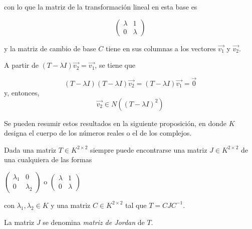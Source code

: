 \noindent
con lo que la matriz de la transformación lineal en esta base es 

$$\left(\begin{array}{cc}  \lambda & 1  \\ 0 &  \lambda
\end{array}
\right)$$
\bigskip

\noindent
y la matriz de cambio de base $C$ tiene en sus columnas a los vectores $\vec{v_1}$ y  $\vec{v_2}$. 

\bigskip





\bigskip

\begin{remark}
A partir de $(T-\lambda I ) \vec{v_2}= \vec{v_1}$, se tiene que 


$$(T-\lambda I )(T-\lambda I ) \vec{v_2}= (T-\lambda I )\vec{v_1}= \vec{0}$$
\noindent
y, entonces,
$$\vec{v_2} \in N((T-\lambda I )^2)$$
\end{remark}

\bigskip


Se pueden resumir estos resultados en la siguiente proposición, en donde $K$ designa el cuerpo de los números reales o el de los complejos.


\bigskip

\begin{theorem}
\label{PROPOSICIÓNJORDAN1}

Dada una matriz $T\in K^{2\times 2 }$ siempre puede encontrarse una matriz $J\in K^{2\times 2 }$ de una cualquiera de las formas


\bigskip

\bigskip

$\left(\begin{array}{cc}  \lambda_1 & 0  \\ 0 &  \lambda_2
\end{array}
\right)$ o $\left(\begin{array}{cc}  \lambda & 1  \\ 0 &  \lambda
\end{array}
\right)$



\bigskip

\bigskip

\noindent
con  $\lambda_1,  \lambda_2  \in K $ y una matriz $C\in K^{2\times 2 }  $ tal que $T= CJC^{-1}$.

\bigskip


\end{theorem}
La matriz $J$ se denomina \textit{matriz de Jordan} de $T$.

